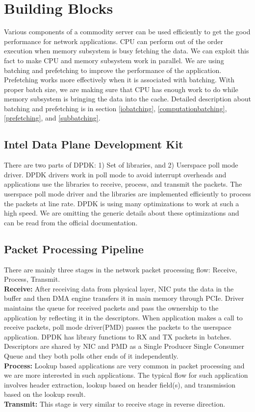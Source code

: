 \section{Building Blocks}
\label{section4}
Various components of a commodity server can be used efficiently to get the good performance for network applications. CPU can perform out of the order execution when memory subsystem is busy fetching the data. We can exploit this fact to make CPU and memory subsystem work in parallel. We are using batching and prefetching to improve the performance of the application. Prefetching works more effectively when it is associated with batching. With proper batch size, we are making sure that CPU has enough work to do while memory subsystem is bringing the data into the cache. Detailed description about batching and prefetching is in section \ref{iobatching}, \ref{computationbatching}, \ref{prefetching}, and \ref{subbatching}.

\subsection{Intel Data Plane Development Kit}
There are two parts of DPDK\cite{DPDK}: 1) Set of libraries, and 2) Userspace poll mode driver. DPDK drivers work in poll mode to avoid interrupt overheads and applications use the libraries to receive, process, and transmit the packets. The userspace poll mode driver and the libraries are implemented efficiently to process the packets at line rate. DPDK is using many optimizations to work at such a high speed. We are omitting the generic details about these optimizations and can be read from the official documentation. 

\subsection{Packet Processing Pipeline}
\label{overview}
There are mainly three stages in the network packet processing flow: Receive, Process, Transmit.
\\
\textbf{Receive:} After receiving data from physical layer, NIC puts the data in the buffer and then DMA engine transfers it in main memory through PCIe. Driver maintains the queue for received packets and pass the ownership to the application by reflecting it in the descriptors. When application makes a call to receive packets, poll mode driver(PMD) passes the packets to the userspace application. DPDK has library functions to RX and TX packets in batches. Descriptors are shared by NIC and PMD as a Single  Producer Single Consumer Queue and they both polls other ends of it independently.
\\
\textbf{Process:} Lookup based applications are very common in packet processing and we are more interested in such applications. The typical flow for such application involves header extraction, lookup based on header field(s), and transmission based on the lookup result.
\\
\textbf{Transmit:} This stage is very similar to receive stage in reverse direction. 

